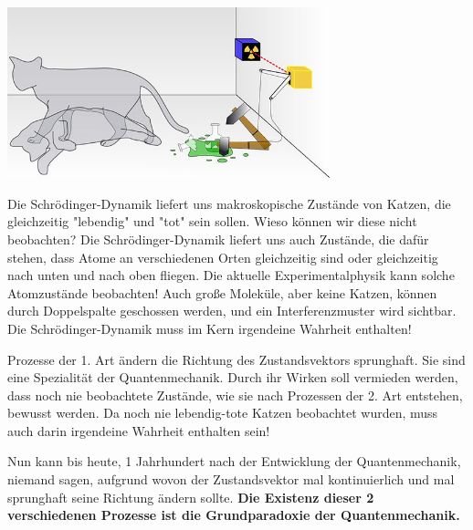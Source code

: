 \documentclass[12pt]{book}
\begin{document}
\begin{center}
\includegraphics[width=0.7\textwidth]{Bilder/Katze.jpg}
\end{center}

Die Schrödinger-Dynamik liefert uns makroskopische Zustände von Katzen, die gleichzeitig "lebendig" und "tot" sein sollen. Wieso können wir diese nicht beobachten? Die Schrödinger-Dynamik liefert uns auch Zustände, die dafür stehen, dass Atome an verschiedenen Orten gleichzeitig sind oder gleichzeitig nach unten und nach oben fliegen. Die aktuelle Experimentalphysik kann solche Atomzustände beobachten! Auch große Moleküle, aber keine Katzen, können durch Doppelspalte geschossen werden, und ein Interferenzmuster wird sichtbar. Die Schrödinger-Dynamik muss im Kern irgendeine Wahrheit enthalten!

Prozesse der 1. Art ändern die Richtung des Zustandsvektors sprunghaft. Sie sind eine Spezialität der Quantenmechanik. Durch ihr Wirken soll vermieden werden, dass noch nie beobachtete Zustände, wie sie nach Prozessen der 2. Art entstehen, bewusst werden. Da noch nie lebendig-tote Katzen beobachtet wurden, muss auch darin irgendeine Wahrheit enthalten sein!

Nun kann bis heute, 1 Jahrhundert nach der Entwicklung der Quantenmechanik, niemand sagen, aufgrund wovon der Zustandsvektor mal kontinuierlich und mal sprunghaft seine Richtung ändern sollte. \textbf{Die Existenz dieser 2 verschiedenen Prozesse ist die Grundparadoxie der Quantenmechanik.}

\end{document}
